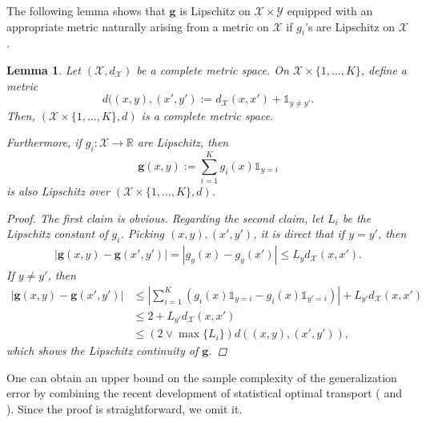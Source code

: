 \documentclass{amsart}
\theoremstyle{plain}
\numberwithin{equation}{section}\newtheorem{theorem}{Theorem}[section]
\newtheorem{lemma}[theorem]{Lemma}
\theoremstyle{remark}
\begin{document}
The following lemma shows that $\bm{g}$ is Lipschitz on $\mathcal{X} \times \mathcal{Y}$ equipped with an appropriate metric naturally arising from a metric on $\mathcal{X}$ if $g_i$'s are Lipschitz on $\mathcal{X}$.



\begin{lemma}\label{lem: extension of complete metric space}
Let $(\mathcal{X},d_\mathcal{X})$ be a complete metric space. On $\mathcal{X} \times \{1, \dots, K\}$, define a metric
\[
    d( (x,y), (x',y'):= d_\mathcal{X}(x,x') + \mathds{1}_{y \neq y'}.
\]
Then, $(\mathcal{X} \times \{1, \dots, K\}, d)$ is a complete metric space.


Furthermore, if $g_i : \mathcal{X} \to \mathbb{R}$ are Lipschitz, then
\[
    \bm{g}(x,y) := \sum_{i=1}^K g_i(x) \mathds{1}_{y=i}
\]
is also Lipschitz over $(\mathcal{X} \times \{1, \dots, K\}, d)$.

\begin{proof}
The first claim is obvious. Regarding the second claim, let $L_i$ be the Lipschitz constant of $g_i$. Picking $(x,y), (x',y')$, it is direct that if $y=y'$, then 
\begin{align*}
    |\bm{g}(x,y) - \bm{g}(x',y')| = |g_y(x) - g_{y}(x')| 
        \leq L_y d_\mathcal{X}(x,x').
\end{align*}
If $y\neq y'$, then 
\begin{align*}
    |\bm{g}(x,y) - \bm{g}(x',y')| 
    &\leq \left|\sum_{i=1}^K \left(g_i(x) \mathds{1}_{y=i} - g_i(x) \mathds{1}_{y'=i} \right)\right| + L_{y'} d_\mathcal{X}(x,x')  \\
    &\leq 2+ L_{y'} d_\mathcal{X}(x,x')\\
    &\leq (2 \vee \max\{L_i\}) d((x,y), (x',y')),
\end{align*}
which shows the Lipschitz continuity of $\bm{g}$.  %
\end{proof}
\end{lemma}








One can obtain an upper bound on the sample complexity of the generalization error by combining the recent development of statistical optimal transport ( and ). Since the proof is straightforward, we omit it.
\end{document}

